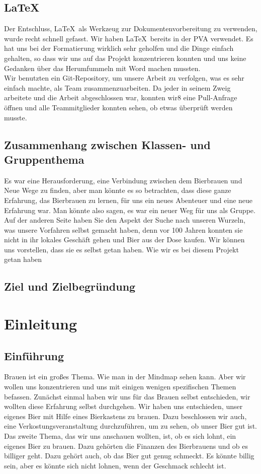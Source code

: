 \subsection{\LaTeX\ }
Der Entschluss, \LaTeX\  als Werkzeug zur Dokumentenvorbereitung zu verwenden, wurde recht schnell gefasst. Wir haben \LaTeX\  bereits in
 der PVA verwendet. Es hat uns bei der Formatierung wirklich sehr geholfen und die Dinge einfach gehalten,
 so dass wir uns auf das Projekt konzentrieren konnten und uns keine Gedanken über das Herumfummeln mit Word machen mussten.
\\
Wir benutzten ein Git-Repository, um unsere Arbeit zu verfolgen, was es sehr einfach machte, als Team zusammenzuarbeiten. Da jeder in seinem Zweig arbeitete und die Arbeit abgeschlossen war,
 konnten wir8 eine Pull-Anfrage öffnen und alle Teammitglieder konnten sehen, ob etwas überprüft werden musste.
\subsection{Zusammenhang zwischen Klassen- und Gruppenthema}
Es war eine Herausforderung, eine Verbindung zwischen dem Bierbrauen und Neue Wege zu finden, aber man könnte es so betrachten, dass diese ganze Erfahrung, das Bierbrauen zu lernen, für uns ein neues Abenteuer und eine neue Erfahrung war. Man könnte also sagen, es war ein neuer Weg für uns als Gruppe.
Auf der anderen Seite haben Sie den Aspekt der Suche nach unseren Wurzeln, was unsere Vorfahren selbst gemacht haben, denn vor 100 Jahren konnten sie nicht in ihr lokales Geschäft gehen und Bier aus der Dose kaufen. Wir können uns vorstellen, dass sie es selbst getan haben. Wie wir es bei diesem Projekt getan haben
\newpage
\subsection{Ziel und Zielbegründung}
\newpage
\section{Einleitung}
\subsection{Einführung}
Brauen ist ein großes Thema. Wie man in der Mindmap sehen kann. Aber wir wollen uns konzentrieren und uns mit einigen wenigen spezifischen Themen befassen.
Zunächst einmal haben wir uns für das Brauen selbst entschieden, wir wollten diese Erfahrung selbst durchgehen. Wir haben uns entschieden, unser eigenes Bier mit Hilfe eines Bierkastens zu brauen. Dazu beschlossen wir auch, eine Verkostungsveranstaltung durchzuführen, um zu sehen, ob unser Bier gut ist. 
Das zweite Thema, das wir uns anschauen wollten, ist, ob es sich lohnt, ein eigenes Bier zu brauen. Dazu gehörten die Finanzen des Bierbrauens und ob es billiger geht. Dazu gehört auch, ob das Bier gut genug schmeckt. Es könnte billig sein, aber es könnte sich nicht lohnen, wenn der Geschmack schlecht ist.

